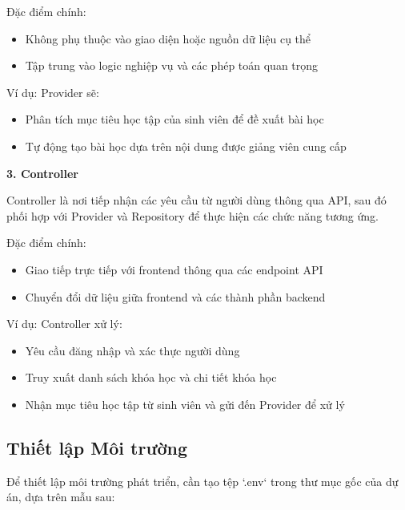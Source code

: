Đặc điểm chính:

\begin{itemize}
    \item Không phụ thuộc vào giao diện hoặc nguồn dữ liệu cụ thể
    \item Tập trung vào logic nghiệp vụ và các phép toán quan trọng
\end{itemize}

Ví dụ: Provider sẽ:

\begin{itemize}
    \item Phân tích mục tiêu học tập của sinh viên để đề xuất bài học
    \item Tự động tạo bài học dựa trên nội dung được giảng viên cung cấp
\end{itemize}
 
\textbf{3. Controller} 

Controller là nơi tiếp nhận các yêu cầu từ người dùng thông qua API, sau đó phối hợp với Provider và Repository để thực hiện các chức năng tương ứng.

Đặc điểm chính:

\begin{itemize}
    \item Giao tiếp trực tiếp với frontend thông qua các endpoint API
    \item Chuyển đổi dữ liệu giữa frontend và các thành phần backend
\end{itemize}

Ví dụ: Controller xử lý:

\begin{itemize}
    \item Yêu cầu đăng nhập và xác thực người dùng
    \item Truy xuất danh sách khóa học và chi tiết khóa học
    \item Nhận mục tiêu học tập từ sinh viên và gửi đến Provider để xử lý
\end{itemize}
\subsection*{Thiết lập Môi trường}

Để thiết lập môi trường phát triển, cần tạo tệp `.env` trong thư mục gốc của dự án, dựa trên mẫu sau:

